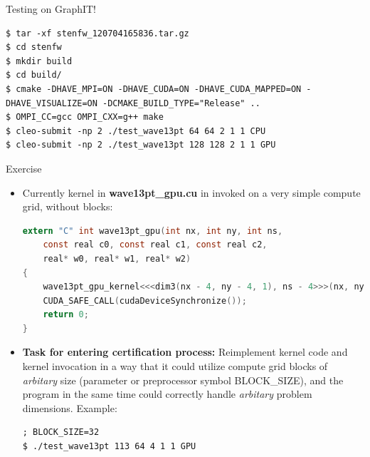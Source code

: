 \documentclass{beamer}
\begin{document}
\begin{frame}[fragile]{Testing on GraphIT!}
\begin{lstlisting}
$ tar -xf stenfw_120704165836.tar.gz 
$ cd stenfw
$ mkdir build
$ cd build/
$ cmake -DHAVE_MPI=ON -DHAVE_CUDA=ON -DHAVE_CUDA_MAPPED=ON -DHAVE_VISUALIZE=ON -DCMAKE_BUILD_TYPE="Release" ..
$ OMPI_CC=gcc OMPI_CXX=g++ make
$ cleo-submit -np 2 ./test_wave13pt 64 64 2 1 1 CPU
$ cleo-submit -np 2 ./test_wave13pt 128 128 2 1 1 GPU
\end{lstlisting}
\end{frame}

\begin{frame}[fragile]{Exercise}
\begin{itemize}
\item[] Currently kernel in \textbf{wave13pt\_gpu.cu} in invoked on a very simple compute grid, without blocks:
\begin{lstlisting}[language=c]
extern "C" int wave13pt_gpu(int nx, int ny, int ns,
	const real c0, const real c1, const real c2,
	real* w0, real* w1, real* w2)
{
	wave13pt_gpu_kernel<<<dim3(nx - 4, ny - 4, 1), ns - 4>>>(nx, ny, ns, c0, c1, c2, w0, w1, w2);
	CUDA_SAFE_CALL(cudaDeviceSynchronize());
	return 0;
}
\end{lstlisting}
\item[] \textbf{Task for entering certification process:} Reimplement kernel code and kernel invocation in a way that it could utilize compute grid blocks of \emph{arbitary} size (parameter or preprocessor symbol BLOCK\_SIZE), and the program in the same time could correctly handle \emph{arbitary} problem dimensions. Example:
\begin{lstlisting}
; BLOCK_SIZE=32
$ ./test_wave13pt 113 64 4 1 1 GPU
\end{lstlisting}
\end{itemize}
\end{frame}
\end{document}
